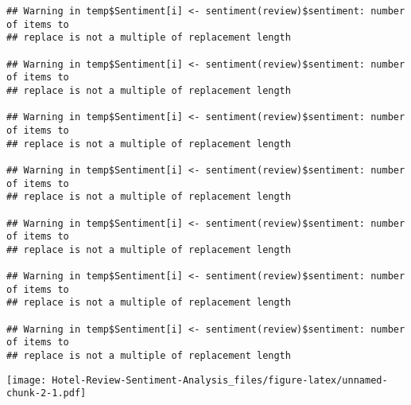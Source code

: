 \documentclass[
]{article}
\newenvironment{Shaded}{\begin{snugshade}}{\end{snugshade}}
\newcommand{\AttributeTok}[1]{\textcolor[rgb]{0.77,0.63,0.00}{#1}}
\newcommand{\DecValTok}[1]{\textcolor[rgb]{0.00,0.00,0.81}{#1}}
\newcommand{\FunctionTok}[1]{\textcolor[rgb]{0.00,0.00,0.00}{#1}}
\newcommand{\NormalTok}[1]{#1}
\newcommand{\OtherTok}[1]{\textcolor[rgb]{0.56,0.35,0.01}{#1}}
\newcommand{\SpecialCharTok}[1]{\textcolor[rgb]{0.00,0.00,0.00}{#1}}
\newcommand{\StringTok}[1]{\textcolor[rgb]{0.31,0.60,0.02}{#1}}
\begin{document}
\begin{verbatim}
## Warning in temp$Sentiment[i] <- sentiment(review)$sentiment: number of items to
## replace is not a multiple of replacement length

## Warning in temp$Sentiment[i] <- sentiment(review)$sentiment: number of items to
## replace is not a multiple of replacement length

## Warning in temp$Sentiment[i] <- sentiment(review)$sentiment: number of items to
## replace is not a multiple of replacement length

## Warning in temp$Sentiment[i] <- sentiment(review)$sentiment: number of items to
## replace is not a multiple of replacement length

## Warning in temp$Sentiment[i] <- sentiment(review)$sentiment: number of items to
## replace is not a multiple of replacement length

## Warning in temp$Sentiment[i] <- sentiment(review)$sentiment: number of items to
## replace is not a multiple of replacement length

## Warning in temp$Sentiment[i] <- sentiment(review)$sentiment: number of items to
## replace is not a multiple of replacement length
\end{verbatim}

\begin{Shaded}
\end{Shaded}

\texttt{[image: Hotel-Review-Sentiment-Analysis\_files/figure-latex/unnamed-chunk-2-1.pdf]}
\end{document}

